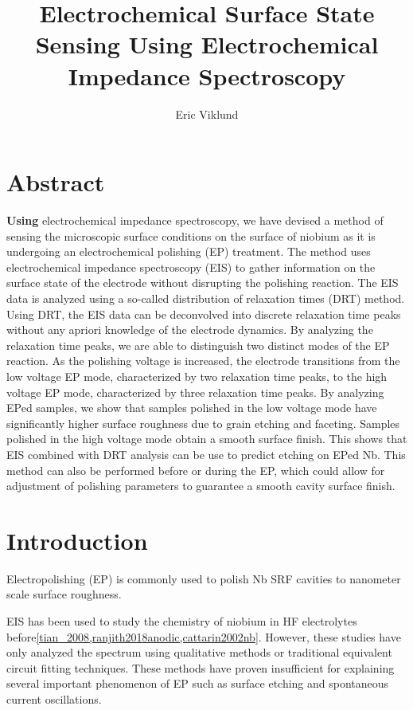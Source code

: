 \documentclass[11pt]{article}
\author{Eric Viklund}
\date{\date}
\title{Electrochemical Surface State Sensing Using Electrochemical Impedance Spectroscopy}
\begin{document}
\maketitle
\tableofcontents


\section{Abstract}
\label{sec:org4ffe8c0}
\textbf{Using} electrochemical impedance spectroscopy, we have devised a method of sensing the microscopic surface conditions on the surface of niobium as it is undergoing an electrochemical polishing (EP) treatment. The method uses electrochemical impedance spectroscopy (EIS) to gather information on the surface state of the electrode without disrupting the polishing reaction. The EIS data is analyzed using a so-called distribution of relaxation times (DRT) method. Using DRT, the EIS data can be deconvolved into discrete relaxation time peaks without any apriori knowledge of the electrode dynamics. By analyzing the relaxation time peaks, we are able to distinguish two distinct modes of the EP reaction. As the polishing voltage is increased, the electrode transitions from the low voltage EP mode, characterized by two relaxation time peaks, to the high voltage EP mode, characterized by three relaxation time peaks. By analyzing EPed samples, we show that samples polished in the low voltage mode have significantly higher surface roughness due to grain etching and faceting. Samples polished in the high voltage mode obtain a smooth surface finish. This shows that EIS combined with DRT analysis can be use to predict etching on EPed Nb. This method can also be performed before or during the EP, which could allow for adjustment of polishing parameters to guarantee a smooth cavity surface finish.

\section{Introduction}
\label{sec:org5ef967f}
Electropolishing (EP) is commonly used to polish Nb SRF cavities to nanometer scale surface roughness. 

EIS has been used to study the chemistry of niobium in HF electrolytes before\ref{tian_2008,ranjith2018anodic,cattarin2002nb}. However, these studies have only analyzed the spectrum using qualitative methods or traditional equivalent circuit fitting techniques. These methods have proven insufficient for explaining several important phenomenon of EP such as surface etching and spontaneous current oscillations.
\end{document}
